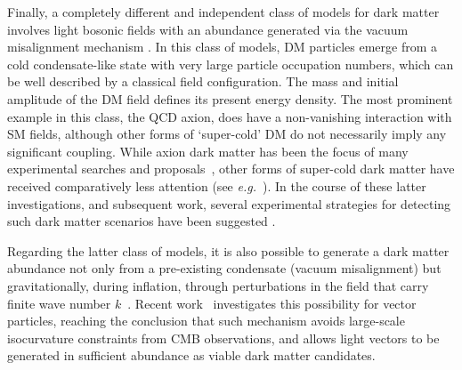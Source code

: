 \documentclass[prd,reprint,nofootinbib,notitlepage,aps,tightenlines,preprintnumbers,amsmath,amssymb,showpacs,superscriptaddress]{revtex4-1}
\begin{document}
Finally, a completely different and independent class of models for
dark matter involves light bosonic fields with an abundance generated
via the vacuum misalignment mechanism
\cite{Preskill:1982cy,Abbott:1982af,Dine:1982ah}. In this class of models, DM
particles emerge from a cold condensate-like state with very large
particle occupation numbers, which can be well described by a
classical field configuration. The mass and initial amplitude of the
DM field defines its present energy density. The most prominent
example in this class, the QCD axion, does have a non-vanishing
interaction with SM fields, although other forms of `super-cold'
DM do not necessarily imply any significant coupling.  While axion
dark matter has been the focus of many experimental searches and
proposals~\cite{Jaeckel:2010ni}, other forms of super-cold dark
matter have received comparatively less attention (see {\em e.g.}~\cite{Matos:2008ag,Piazza:2010ye,Nelson:2011sf,Horns:2012jf}).
%
In the course of these latter investigations, and subsequent work,
several experimental strategies for detecting such dark matter
scenarios have been suggested
\cite{Jaeckel:2013sqa,Arias:2014ela,Chaudhuri:2014dla}.

Regarding the latter class of models, it is also possible to generate
a dark matter abundance not only from a pre-existing condensate
(vacuum misalignment) but gravitationally, during inflation, through
perturbations in the field that carry finite wave number
$k$~\cite{Mukhanov:1990me}. Recent work~\cite{Graham:2015rva}
investigates this possibility for vector particles, reaching the
conclusion that such mechanism avoids large-scale isocurvature
constraints from CMB observations, and allows light vectors to be
generated in sufficient abundance as viable dark matter candidates.
\end{document}
